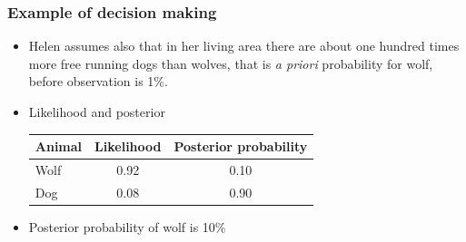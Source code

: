 \documentclass[10pt]{beamer}
\begin{document}
\begin{frame}

\frametitle{Example of decision making}

  \begin{itemize}
  \item<+-> Helen assumes also that in her living area there are about one hundred times more free running dogs than wolves, that is {\em a
      priori} probability for wolf, before observation is 1\%.
  \item<+-> Likelihood and posterior
    \begin{center}\leavevmode
      \begin{tabular}{| l | c c |}
        \hline
        Animal &  Likelihood & Posterior probability \\
        \hline
        Wolf     &  0.92            & 0.10      \\
        Dog    &  0.08        & 0.90    \\
        \hline
      \end{tabular}
    \end{center}
  \item<+-> Posterior probability of wolf is 10\%
  \end{itemize}

\end{frame}
\end{document}
